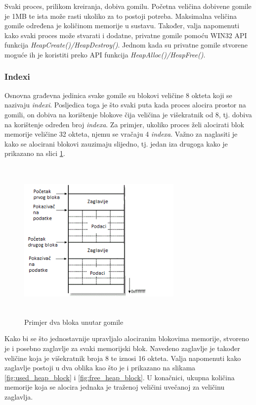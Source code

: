 \documentclass[times, utf8, diplomski, numeric]{fer}
\begin{document}
Svaki proces, prilikom kreiranja, dobiva gomilu. Početna veličina dobivene gomile je 1MB te ista može rasti ukoliko za to postoji potreba. Maksimalna veličina gomile određena je količinom memorije u sustavu. Također, valja napomenuti kako svaki proces može stvarati i dodatne, privatne gomile pomoću WIN32 API funkcija \emph{HeapCreate()/HeapDestroy()}. Jednom kada su privatne gomile stvorene moguće ih je koristiti preko API funkcija \emph{HeapAlloc()/HeapFree()}.

\subsubsection{Indexi}
Osnovna građevna jedinica svake gomile su blokovi veličine 8 okteta koji se nazivaju \emph{indexi}. Posljedica toga je što svaki puta kada proces alocira prostor na gomili, on dobiva na korištenje blokove čija veličina je višekratnik od 8, tj. dobiva na korištenje određen broj \emph{indexa}. Za primjer, ukoliko proces želi alocirati blok memorije veličine 32 okteta, njemu se vračaju 4 \emph{indexa}. Važno za naglasiti je kako se alocirani blokovi zauzimaju slijedno, tj. jedan iza drugoga kako je prikazano na slici \ref{fig:heap_2_allocated_blocks}.

\begin{figure}[!ht]
\centering
\setlength\fboxsep{0pt}
\setlength\fboxrule{0.5pt}
\includegraphics[width=8cm, height=8cm]{slike/heap_2_allocated_blocks}
\caption{Primjer dva bloka unutar gomile}
\label{fig:heap_2_allocated_blocks} 
\end{figure}

Kako bi se što jednostavnije upravljalo alociranim blokovima memorije, stvoreno je i posebno zaglavlje za svaki memorijski blok. Navedeno zaglavlje je također veličine koja je višekratnik broja 8 te iznosi 16 okteta. Valja napomenuti kako zaglavlje postoji u dva oblika kao što je i prikazano na slikama \ref{fig:used_heap_block} i \ref{fig:free_heap_block}. U konačnici, ukupna količina memorije koja se alocira jednaka je traženoj veličini uvečanoj za veličinu zaglavlja.
\pagebreak
\end{document}
